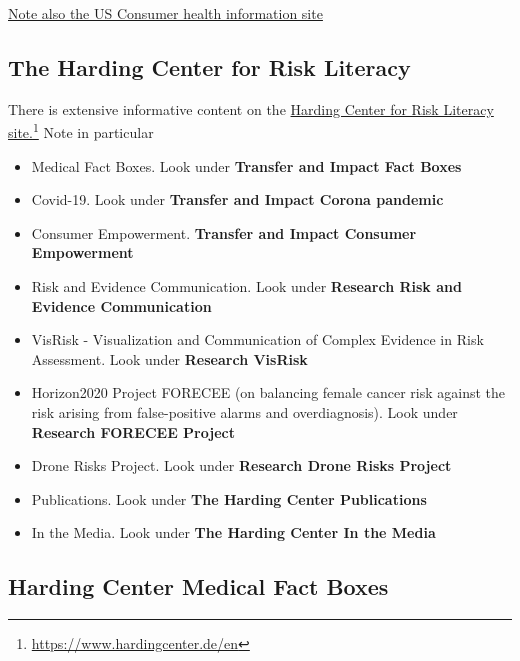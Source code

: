 \documentclass[
  10ptls,
  b5paper]{book}
\providecommand{\tightlist}{%
  \setlength{\itemsep}{0pt}\setlength{\parskip}{0pt}}
\begin{document}
\href{https://medlineplus.gov/}{Note also the US Consumer health information
site}

\hypertarget{the-harding-center-for-risk-literacy}{%
\subsection*{The Harding Center for Risk Literacy}\label{the-harding-center-for-risk-literacy}}

There is extensive informative content on the \href{https://www.hardingcenter.de/en}{Harding Center for Risk
Literacy site.}\footnote{\url{https://www.hardingcenter.de/en}} Note in
particular

\begin{itemize}
\tightlist
\item
  Medical Fact Boxes. Look under \textbf{Transfer and Impact \textbar{} Fact Boxes}
\item
  Covid-19. Look under \textbf{Transfer and Impact \textbar{} Corona pandemic}
\item
  Consumer Empowerment. \textbf{Transfer and Impact \textbar{} Consumer
  Empowerment}
\item
  Risk and Evidence Communication. Look under \textbf{Research \textbar{} Risk and
  Evidence Communication}
\item
  VisRisk - Visualization and Communication of Complex Evidence in
  Risk Assessment. Look under \textbf{Research \textbar{} VisRisk}
\item
  Horizon2020 Project FORECEE (on balancing female cancer risk against
  the risk arising from false-positive alarms and overdiagnosis). Look
  under \textbf{Research \textbar{} FORECEE Project}
\item
  Drone Risks Project. Look under \textbf{Research \textbar{} Drone Risks Project}
\item
  Publications. Look under \textbf{The Harding Center \textbar{} Publications}
\item
  In the Media. Look under \textbf{The Harding Center \textbar{} In the Media}
\end{itemize}

\hypertarget{harding-center-medical-fact-boxes}{%
\subsection*{Harding Center Medical Fact Boxes}\label{harding-center-medical-fact-boxes}}
\end{document}
